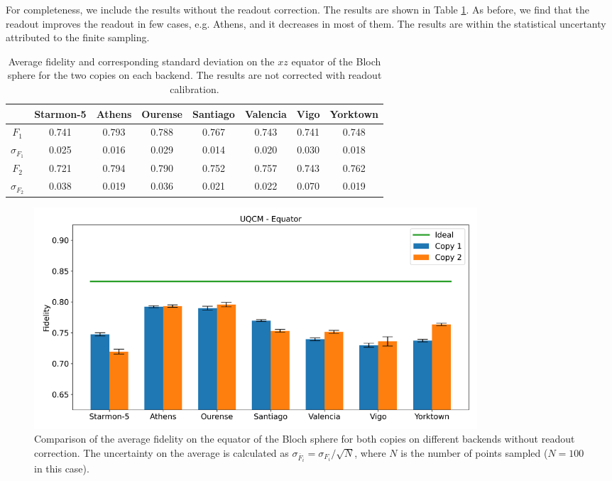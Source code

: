 For completeness, we include the results without the readout correction. The results are shown in Table \ref{tab:uqcm_results_eq_non}. As before, we find that the readout improves the readout in few cases, e.g. Athens, and it decreases in most of them. The results are within the statistical uncertanty attributed to the finite sampling.

\begin{table}[H]
    \centering
    \begin{tabular}{|c|c|c|c|c|c|c|c|}
    \hline
    \textbf{} & \textbf{Starmon-5} & \textbf{Athens} & \textbf{Ourense} & \textbf{Santiago} & \textbf{Valencia} & \textbf{Vigo} & \textbf{Yorktown} \\ \hline
    $F_1$              & 0.741 & 0.793 & 0.788 & 0.767 & 0.743 & 0.741 & 0.748\\ \hline
    $\sigma_{F_1}$     & 0.025 & 0.016 & 0.029 & 0.014 & 0.020 & 0.030 & 0.018 \\ \hline
    $F_2$              & 0.721 & 0.794 & 0.790 & 0.752 & 0.757 & 0.743 & 0.762 \\ \hline
    $\sigma_{F_2}$     & 0.038 & 0.019 & 0.036 & 0.021 & 0.022 & 0.070 & 0.019 \\ \hline
    \end{tabular}
    \caption{Average fidelity and corresponding standard deviation on the $xz$ equator of the Bloch sphere for the two copies on each backend. The results are not corrected with readout calibration.}\label{tab:uqcm_results_eq_non}
\end{table}

\begin{figure}[H]
    \centering
            \includegraphics[width=0.8\textwidth]{Figures/UQCM/Histograms/histo_equator_corrected.png}
        
        \caption{Comparison of the average fidelity on the equator of the Bloch sphere for both copies on different backends without readout correction. The uncertainty on the average is calculated as $\sigma_{\overline{F}_i}=\sigma_{F_i}/\sqrt{N}$, where $N$ is the number of points sampled ($N=100$ in this case).}\label{fig:hist_uqcm_sphere}
\end{figure}

